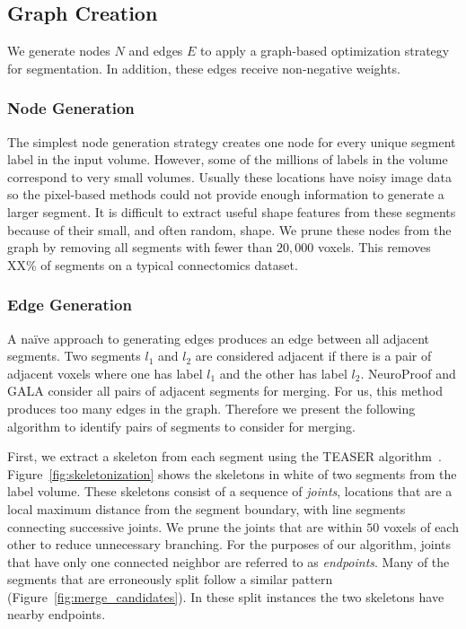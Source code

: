 \subsection{Graph Creation}
\label{sec:skeletonization}
We generate nodes $N$ and edges $E$ to apply a graph-based optimization strategy for segmentation. 
In addition, these edges receive non-negative weights.

\subsubsection{Node Generation}

The simplest node generation strategy creates one node for every unique segment label in the input volume.
However, some of the millions of labels in the volume correspond to very small volumes. 
Usually these locations have noisy image data so the pixel-based methods could not provide enough information to generate a larger segment.
It is difficult to extract useful shape features from these segments because of their small, and often random, shape. 
We prune these nodes from the graph by removing all segments with fewer than $20,000$ voxels. 
This removes XX\% of segments on a typical connectomics dataset. 

\subsubsection{Edge Generation}

A na\"ive approach to generating edges produces an edge between all adjacent segments.
Two segments $l_1$ and $l_2$ are considered adjacent if there is a pair of adjacent voxels where one has label $l_1$ and the other has label $l_2$. 
NeuroProof and GALA consider all pairs of adjacent segments for merging. 
For us, this method produces too many edges in the graph. 
Therefore we present the following algorithm to identify pairs of segments to consider for merging. 

First, we extract a skeleton from each segment using the TEASER algorithm~\cite{sato2000teasar,zhao2014automatic}.
Figure~\ref{fig:skeletonization} shows the skeletons in white of two segments from the label volume.
These skeletons consist of a sequence of \textit{joints}, locations that are a local maximum distance from the segment boundary, with line segments connecting successive joints. 
We prune the joints that are within $50$ voxels of each other to reduce unnecessary branching.
For the purposes of our algorithm, joints that have only one connected neighbor are referred to as \textit{endpoints}. 
Many of the segments that are erroneously split follow a similar pattern (Figure~\ref{fig:merge_candidates}). 
In these split instances the two skeletons have nearby endpoints.

